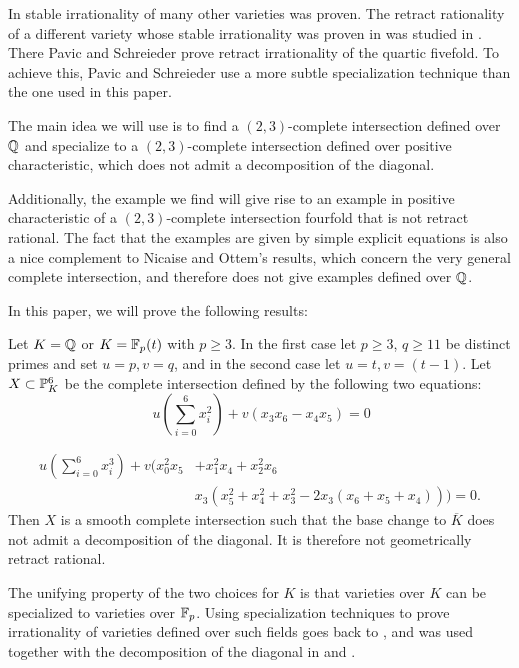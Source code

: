 In \cite{NicaiseOttem} stable irrationality of many other varieties was proven. The retract rationality of a different variety whose stable irrationality was proven in \cite{NicaiseOttem} was studied in \cite{PavicSchreieder}. There Pavic and Schreieder prove retract irrationality of the quartic fivefold. To achieve this, Pavic and Schreieder use a more subtle specialization technique than the one used in this paper.

The main idea we will use is to find a $(2,3)$-complete intersection defined over $\Q$ and specialize to a $(2,3)$-complete intersection defined over positive characteristic, which does not admit a decomposition of the diagonal.
 
Additionally, the example we find will give rise to an example in positive characteristic of a $(2,3)$-complete intersection fourfold that is not retract rational. The fact that the examples are given by simple explicit equations is also a nice complement to Nicaise and Ottem's results, which concern the very general complete intersection, and therefore does not give examples defined over $\Q$.

 
In this paper, we will prove the following results:
\begin{theorem}
	\label{thm:intro}
	Let $K=\Q$ or $K=\F_p(t)$ with $p \geq 3$. In the first case let $p \geq 3$, $q \geq 11$ be distinct primes and set $u=p,v=q$, and in the second case let $u=t,v=(t-1)$. Let $X \subset \P^6_K$ be the complete intersection defined by the following two equations:
	\begin{equation}
		\label{eq:quadricIntro}
		\ u \left(\sum_{i=0}^6 x_i^2 \right) + v(x_3x_6-x_4x_5)=0
	\end{equation}
	
	\begin{align}
			 u \left(\sum_{i=0}^6 x_i^3 \right) + v(x_0^2x_5 &+ x_1^2x_4 + x_2^2x_6 \nonumber \\ &x_3(x_5^2+x_4^2+x_3^2 -2x_3(x_6 + x_5 + x_4)))=0.
	\end{align}
Then $X$ is a smooth complete intersection such that the base change to $\overline{K}$ does not admit a decomposition of the diagonal. It is therefore not geometrically retract rational.
\end{theorem}

The unifying property of the two choices for $K$ is that varieties over $K$ can be specialized to varieties over $\F_p$. Using specialization techniques to prove irrationality of varieties defined over such fields goes back to \cite{KollarHypersurfaces}, and was used together with the decomposition of the diagonal in \cite{Tot16} and \cite{SchreiederHypersurface}.

